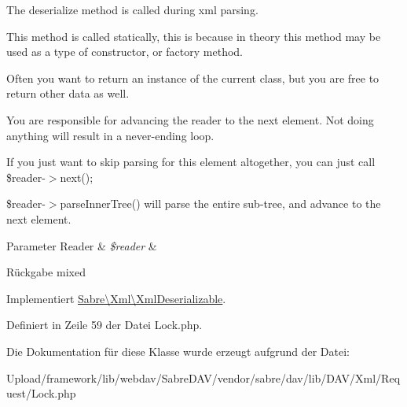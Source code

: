 The deserialize method is called during xml parsing.

This method is called statically, this is because in theory this method may be used as a type of constructor, or factory method.

Often you want to return an instance of the current class, but you are free to return other data as well.

You are responsible for advancing the reader to the next element. Not doing anything will result in a never-\/ending loop.

If you just want to skip parsing for this element altogether, you can just call \$reader-\/$>$next();

\$reader-\/$>$parse\+Inner\+Tree() will parse the entire sub-\/tree, and advance to the next element.


\begin{DoxyParams}[1]{Parameter}
Reader & {\em \$reader} & \\
\hline
\end{DoxyParams}
\begin{DoxyReturn}{Rückgabe}
mixed 
\end{DoxyReturn}


Implementiert \mbox{\hyperlink{interface_sabre_1_1_xml_1_1_xml_deserializable_a19e0eca545b9a0d93f7d6b69085ade30}{Sabre\textbackslash{}\+Xml\textbackslash{}\+Xml\+Deserializable}}.



Definiert in Zeile 59 der Datei Lock.\+php.



Die Dokumentation für diese Klasse wurde erzeugt aufgrund der Datei\+:\begin{DoxyCompactItemize}
\item 
Upload/framework/lib/webdav/\+Sabre\+D\+A\+V/vendor/sabre/dav/lib/\+D\+A\+V/\+Xml/\+Request/Lock.\+php\end{DoxyCompactItemize}
